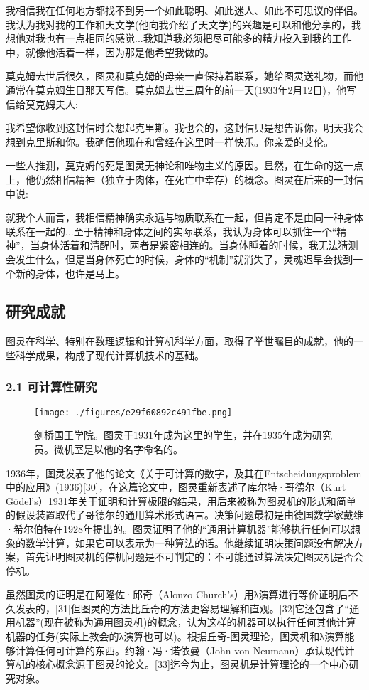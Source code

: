 我相信我在任何地方都找不到另一个如此聪明、如此迷人、如此不可思议的伴侣。我认为我对我的工作和天文学(他向我介绍了天文学)的兴趣是可以和他分享的，我想他对我也有一点相同的感觉...我知道我必须把尽可能多的精力投入到我的工作中，就像他活着一样，因为那是他希望我做的。

莫克姆去世后很久，图灵和莫克姆的母亲一直保持着联系，她给图灵送礼物，而他通常在莫克姆生日那天写信。莫克姆去世三周年的前一天(1933年2月12日)，他写信给莫克姆夫人:

我希望你收到这封信时会想起克里斯。我也会的，这封信只是想告诉你，明天我会想到克里斯和你。我确信他现在和曾经在这里时一样快乐。你亲爱的艾伦。

一些人推测，莫克姆的死是图灵无神论和唯物主义的原因。显然，在生命的这一点上，他仍然相信精神（独立于肉体，在死亡中幸存）的概念。图灵在后来的一封信中说:

就我个人而言，我相信精神确实永远与物质联系在一起，但肯定不是由同一种身体联系在一起的...至于精神和身体之间的实际联系，我认为身体可以抓住一个“精神”，当身体活着和清醒时，两者是紧密相连的。当身体睡着的时候，我无法猜测会发生什么，但是当身体死亡的时候，身体的“机制”就消失了，灵魂迟早会找到一个新的身体，也许是马上。

\subsection{研究成就}
图灵在科学、特别在数理逻辑和计算机科学方面，取得了举世瞩目的成就，他的一些科学成果，构成了现代计算机技术的基础。
\subsubsection{2.1 可计算性研究}
\begin{figure}[ht]
\centering
\texttt{[image: ./figures/e29f60892c491fbe.png]}
\caption{剑桥国王学院。图灵于1931年成为这里的学生，并在1935年成为研究员。微机室是以他的名字命名的。} \label{fig_ALTL_1}
\end{figure}
1936年，图灵发表了他的论文《关于可计算的数字，及其在Entscheidungsproblem中的应用》(1936)[30]，在这篇论文中，图灵重新表述了库尔特·哥德尔（Kurt Gödel's）1931年关于证明和计算极限的结果，用后来被称为图灵机的形式和简单的假设装置取代了哥德尔的通用算术形式语言。决策问题最初是由德国数学家戴维·希尔伯特在1928年提出的。图灵证明了他的“通用计算机器”能够执行任何可以想象的数学计算，如果它可以表示为一种算法的话。他继续证明决策问题没有解决方案，首先证明图灵机的停机问题是不可判定的：不可能通过算法决定图灵机是否会停机。

虽然图灵的证明是在阿隆佐·邱奇（Alonzo Church's）用λ演算进行等价证明后不久发表的，[31]但图灵的方法比丘奇的方法更容易理解和直观。[32]它还包含了“通用机器”(现在被称为通用图灵机)的概念，认为这样的机器可以执行任何其他计算机器的任务(实际上教会的λ演算也可以)。根据丘奇-图灵理论，图灵机和λ演算能够计算任何可计算的东西。约翰·冯·诺依曼（John von Neumann）承认现代计算机的核心概念源于图灵的论文。[33]迄今为止，图灵机是计算理论的一个中心研究对象。

